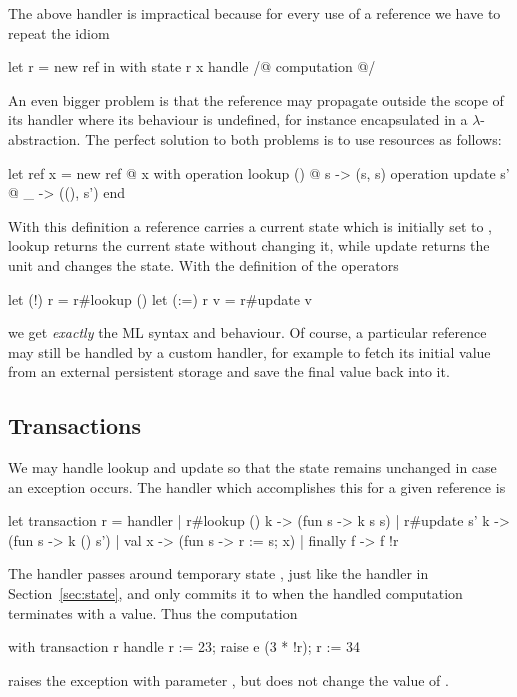 The above handler is impractical because for every use of a reference we have to repeat the idiom
%
\begin{source}
let r = new ref in
  with state r x handle
    /@ computation @/
\end{source}
%
An even bigger problem is that the reference may propagate outside the scope of its handler where its behaviour is undefined, for instance encapsulated in a $\lambda$-abstraction.
The perfect solution to both problems is to use resources as follows:
%
\begin{source}
let ref x =
  new ref @ x with
    operation lookup () @ s -> (s, s)
    operation update s' @ _ -> ((), s')
  end
\end{source}
%
With this definition a reference carries a current state which is initially set to , lookup returns the current state without changing it, while update returns the unit and changes the state. With the definition of the operators
%
\begin{source}
let (!) r = r#lookup ()
let (:=) r v = r#update v
\end{source}
%
we get \emph{exactly} the ML syntax and behaviour. Of course, a particular reference may still be handled by a custom handler, for example to fetch its initial value from an external persistent storage and save the final value back into it. 

\subsection{Transactions}

We may handle lookup and update so that the state remains unchanged in case an exception occurs. 
The handler which accomplishes this for a given reference  is
%
\begin{source}
let transaction r = handler
  | r#lookup () k -> (fun s -> k s s)
  | r#update s' k -> (fun s -> k () s')
  | val x -> (fun s -> r := s; x)
  | finally f -> f !r
\end{source}
%
The handler passes around temporary state , just like the  handler in Section~\ref{sec:state}, and only commits it to  when the handled computation terminates with a value. Thus the computation
%
\begin{source}
with transaction r handle
  r := 23;
  raise e (3 * !r);
  r := 34
\end{source}
%
raises the exception  with parameter , but does not change the value of .

